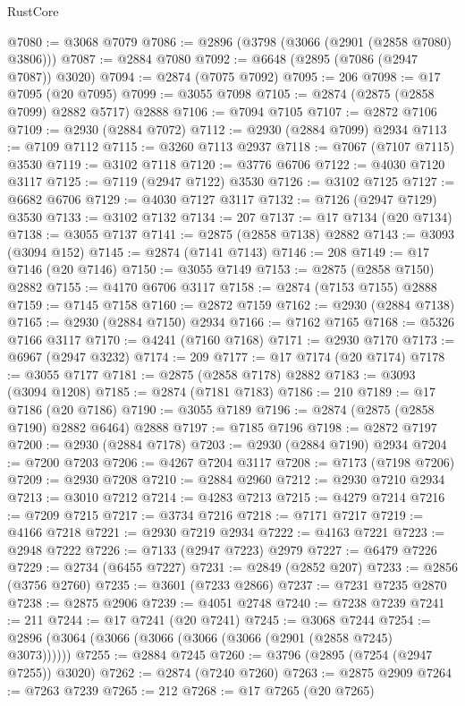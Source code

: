 \begin{lexlean}{RustCore}
\begin{coremodule}
@7080 := @3068 @7079
@7086 := @2896 (@3798 (@3066 (@2901 (@2858 @7080) @3806)))
@7087 := @2884 @7080
@7092 := @6648 (@2895 (@7086 (@2947 @7087)) @3020)
@7094 := @2874 (@7075 @7092)
@7095 := 206
@7098 := @17 @7095 (@20 @7095)
@7099 := @3055 @7098
@7105 := @2874 (@2875 (@2858 @7099) @2882 @5717) @2888
@7106 := @7094 @7105
@7107 := @2872 @7106
@7109 := @2930 (@2884 @7072)
@7112 := @2930 (@2884 @7099) @2934
@7113 := @7109 @7112
@7115 := @3260 @7113 @2937
@7118 := @7067 (@7107 @7115) @3530
@7119 := @3102 @7118
@7120 := @3776 @6706
@7122 := @4030 @7120 @3117
@7125 := @7119 (@2947 @7122) @3530
@7126 := @3102 @7125
@7127 := @6682 @6706
@7129 := @4030 @7127 @3117
@7132 := @7126 (@2947 @7129) @3530
@7133 := @3102 @7132
@7134 := 207
@7137 := @17 @7134 (@20 @7134)
@7138 := @3055 @7137
@7141 := @2875 (@2858 @7138) @2882
@7143 := @3093 (@3094 @152)
@7145 := @2874 (@7141 @7143)
@7146 := 208
@7149 := @17 @7146 (@20 @7146)
@7150 := @3055 @7149
@7153 := @2875 (@2858 @7150) @2882
@7155 := @4170 @6706 @3117
@7158 := @2874 (@7153 @7155) @2888
@7159 := @7145 @7158
@7160 := @2872 @7159
@7162 := @2930 (@2884 @7138)
@7165 := @2930 (@2884 @7150) @2934
@7166 := @7162 @7165
@7168 := @5326 @7166 @3117
@7170 := @4241 (@7160 @7168)
@7171 := @2930 @7170
@7173 := @6967 (@2947 @3232)
@7174 := 209
@7177 := @17 @7174 (@20 @7174)
@7178 := @3055 @7177
@7181 := @2875 (@2858 @7178) @2882
@7183 := @3093 (@3094 @1208)
@7185 := @2874 (@7181 @7183)
@7186 := 210
@7189 := @17 @7186 (@20 @7186)
@7190 := @3055 @7189
@7196 := @2874 (@2875 (@2858 @7190) @2882 @6464) @2888
@7197 := @7185 @7196
@7198 := @2872 @7197
@7200 := @2930 (@2884 @7178)
@7203 := @2930 (@2884 @7190) @2934
@7204 := @7200 @7203
@7206 := @4267 @7204 @3117
@7208 := @7173 (@7198 @7206)
@7209 := @2930 @7208
@7210 := @2884 @2960
@7212 := @2930 @7210 @2934
@7213 := @3010 @7212
@7214 := @4283 @7213
@7215 := @4279 @7214
@7216 := @7209 @7215
@7217 := @3734 @7216
@7218 := @7171 @7217
@7219 := @4166 @7218
@7221 := @2930 @7219 @2934
@7222 := @4163 @7221
@7223 := @2948 @7222
@7226 := @7133 (@2947 @7223) @2979
@7227 := @6479 @7226
@7229 := @2734 (@6455 @7227)
@7231 := @2849 (@2852 @207)
@7233 := @2856 (@3756 @2760)
@7235 := @3601 (@7233 @2866)
@7237 := @7231 @7235 @2870
@7238 := @2875 @2906
@7239 := @4051 @2748
@7240 := @7238 @7239
@7241 := 211
@7244 := @17 @7241 (@20 @7241)
@7245 := @3068 @7244
@7254 := @2896 (@3064 (@3066 (@3066 (@3066 (@3066 (@2901 (@2858 @7245) @3073))))))
@7255 := @2884 @7245
@7260 := @3796 (@2895 (@7254 (@2947 @7255)) @3020)
@7262 := @2874 (@7240 @7260)
@7263 := @2875 @2909
@7264 := @7263 @7239
@7265 := 212
@7268 := @17 @7265 (@20 @7265)

\end{coremodule}
\end{lexlean}
